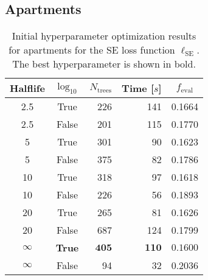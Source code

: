 


\subsection*{Apartments}

 \begin{table}[h!]
  \begin{tabular}{@{}ccrrc@{}}
    Halflife & $\log_{10}$ & $N_\mathrm{trees}$ & Time [$s$] & $f_\mathrm{eval}$ \\
    \midrule
    \num{2.5} & True & \num{226} & \num{141} & \num{0.1664} \\
    \num{2.5} & False & \num{201} & \num{115} & \num{0.1770} \\
    \num{5} & True & \num{301} & \num{90} & \num{0.1623} \\
    \num{5} & False & \num{375} & \num{82} & \num{0.1786} \\
    \num{10} & True & \num{318} & \num{97} & \num{0.1618} \\
    \num{10} & False & \num{226} & \num{56} & \num{0.1893} \\
    \num{20} & True & \num{265} & \num{81} & \num{0.1626} \\
    \num{20} & False & \num{687} & \num{124} & \num{0.1799} \\
    $\bm{\infty}$ & \textbf{True} & $\mathbf{405}$ & $\mathbf{110}$ & $\mathbf{0.1600}$ \\
    $\infty$ & False & \num{94} & \num{32} & \num{0.2036} \\
  \end{tabular}
  \caption[Initial Hyperparameter Optimization Results for Apartments -- SE Loss Function]{\label{tab:h:HPO_initial_Rmse-ejerlejlighed-appendix}Initial hyperparameter optimization results for apartments for the SE loss function $\ell_\mathrm{SE}$. The best hyperparameter is shown in bold.}
\end{table}


